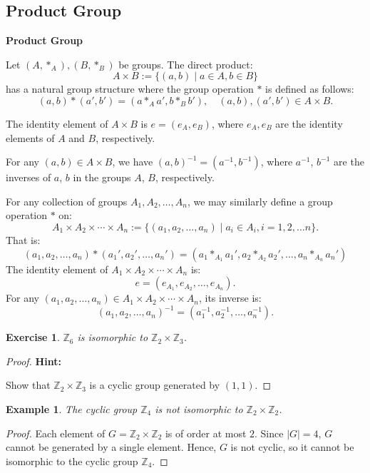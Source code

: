 \documentclass[a4paper,12pt]{report}
\newcommand{\abs}[1]{\left|#1\right|}
\newcounter{statement}
\numberwithin{statement}{chapter}
\newtheorem{eg}[statement]{\bf Example}
\newtheorem{ex}[statement]{\bf Exercise}
\numberwithin{equation}{chapter}
\numberwithin{section}{chapter}
\numberwithin{subsection}{section}
\begin{document}
\subsection*{Product Group}

 {\bf Product Group} 



Let $(A, \ast_A), (B, \ast_B)$ be groups.  The direct product:
\[
A \times B := \{(a, b)\;|\; a\in A, b \in B\}
\]
has a natural group structure 
where the group operation $\ast$ is defined as follows:
\[
(a, b)\ast(a', b') = (a\ast_A a', b\ast_B b'), \quad (a, b), (a', b') \in A\times B. 
\]

The identity element of $A \times B$ is $e = (e_A, e_B)$, where $e_A, e_B$ 
are the identity elements of $A$ and $B$, respectively.




For any $(a, b) \in A \times B$, we have $(a, b)^{-1} = (a^{-1}, b^{-1})$,
where $a^{-1}$, $b^{-1}$ are the inverses of $a$, $b$ in the groups $A$, $B$, 
respectively.




For any collection of groups $A_1, A_2, \ldots, A_n$,
we may similarly define a group operation $\ast$ on:
\[
A_1 \times A_2 \times \cdots \times A_n
:= \{(a_1, a_2, \ldots, a_n)\;|\;a_i \in A_i, i = 1, 2, \ldots n\}.
\]
That is:
\[
(a_1, a_2, \ldots, a_n)\ast (a_1', a_2', \ldots, a_n')
=
(a_1\ast_{A_1} a_1', a_2\ast_{A_2} a_2', \ldots, a_n \ast_{A_n} a_n')
\]
The identity element of $A_1 \times A_2 \times \cdots \times A_n$ is:
\[
e = (e_{A_1}, e_{A_2}, \ldots, e_{A_n}).
\]
For any $(a_1, a_2, \ldots, a_n) \in A_1 \times A_2 \times \cdots \times A_n$, 
its inverse is:
\[
(a_1, a_2, \ldots, a_n)^{-1} = (a_1^{-1}, a_2^{-1}, \ldots, a_n^{-1}).
\]


\begin{ex}
$\mathbb{Z}_6$ is isomorphic to $\mathbb{Z}_2\times\mathbb{Z}_3$.
\end{ex}
\begin{proof}

 {\bf Hint:} 



Show that $\mathbb{Z}_2\times\mathbb{Z}_3$ is a cyclic group generated by $(1, 1)$.
\end{proof}
\begin{eg}

The cyclic group $\mathbb{Z}_4$ is not isomorphic to $\mathbb{Z}_2 \times \mathbb{Z}_2$.
\end{eg}
\begin{proof}

Each element of $G = \mathbb{Z}_2\times\mathbb{Z}_2$ is of order at most $2$.
Since $\abs{G} = 4$, $G$ cannot be generated by a single element.  
Hence, $G$ is not cyclic,
so it cannot be isomorphic to the cyclic group $\mathbb{Z}_4$.


\end{proof}
\end{document}
